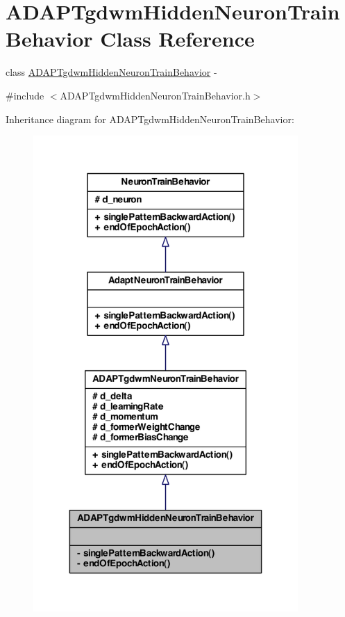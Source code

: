 \hypertarget{class_a_d_a_p_tgdwm_hidden_neuron_train_behavior}{
\section{ADAPTgdwmHiddenNeuronTrainBehavior Class Reference}
\label{class_a_d_a_p_tgdwm_hidden_neuron_train_behavior}
}


class \hyperlink{class_a_d_a_p_tgdwm_hidden_neuron_train_behavior}{ADAPTgdwmHiddenNeuronTrainBehavior} -\/  




{\ttfamily \#include $<$ADAPTgdwmHiddenNeuronTrainBehavior.h$>$}



Inheritance diagram for ADAPTgdwmHiddenNeuronTrainBehavior:
\nopagebreak
\begin{figure}[H]
\begin{center}
\leavevmode
\includegraphics[width=286pt]{class_a_d_a_p_tgdwm_hidden_neuron_train_behavior__inherit__graph}
\end{center}
\end{figure}


